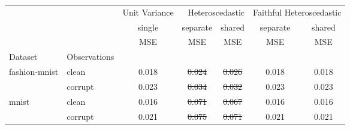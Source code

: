 \begin{tabular}{ll|c|cc|cc}
\toprule
{} & {} & {Unit Variance} & \multicolumn{2}{r}{Heteroscedastic} & \multicolumn{2}{r}{Faithful Heteroscedastic} \\
{} & {} & {single} & {separate} & {shared} & {separate} & {shared} \\
{} & {} & {MSE} & {MSE} & {MSE} & {MSE} & {MSE} \\
{Dataset} & {Observations} & {} & {} & {} & {} & {} \\
\midrule
\multirow[c]{2}{*}{fashion-mnist} & clean & 0.018 & \sout{0.024} & \sout{0.026} & 0.018 & 0.018 \\
 & corrupt & 0.023 & \sout{0.034} & \sout{0.032} & 0.023 & 0.023 \\
\multirow[c]{2}{*}{mnist} & clean & 0.016 & \sout{0.071} & \sout{0.067} & 0.016 & 0.016 \\
 & corrupt & 0.021 & \sout{0.075} & \sout{0.071} & 0.021 & 0.021 \\
\bottomrule
\end{tabular}
